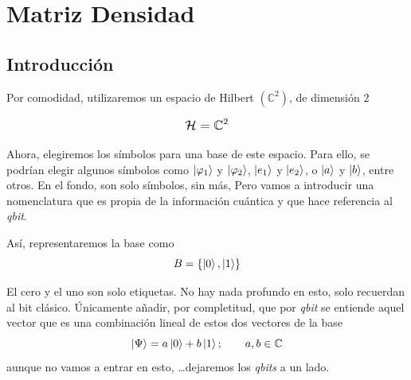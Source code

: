 %
%

\chapter{Matriz Densidad}

\section{Introducción}
Por comodidad, utilizaremos un espacio de Hilbert $\left(\mathbb{C}^2\right)$,
de dimensión 2

\[
  \mathlarger{\mathcal{H} = \mathbb{C}^2}
\]

Ahora, elegiremos los símbolos para una base de este espacio. Para ello, se
podrían elegir algunos símbolos como $\ket{\varphi_1}$ y $\ket{\varphi_2}$,
$\ket{e_1}$ y $\ket{e_2}$, o $\ket{a}$ y $\ket{b}$, entre otros. En el fondo,
son solo símbolos, sin más, Pero vamos a introducir una nomenclatura que es
propia de la información cuántica y que hace referencia al \emph{qbit}.

Así, representaremos la base\footnotemark{} como
\[
  B = \{\ket{0}, \ket{1}\}
\]

El cero y el uno son solo etiquetas. No hay nada profundo en esto, solo
recuerdan al bit clásico. Únicamente añadir, por completitud, que por
\emph{qbit} se entiende aquel vector que es una combinación lineal de estos
dos vectores de la base
\[
  \ket{\Psi} = a \ket{0} + b \ket{1} ;
  \hspace{2em} a, b \in \mathbb{C}
\]
aunque no vamos a entrar en esto, \dots dejaremos los \emph{qbits} a un lado.

